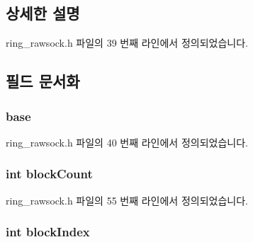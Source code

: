 \subsection{상세한 설명}


ring\+\_\+rawsock.\+h 파일의 39 번째 라인에서 정의되었습니다.



\subsection{필드 문서화}
\subsubsection[{\texorpdfstring{base}{base}}]{ base}\hypertarget{structring__rawsock__t_a1507c5af4508d59cb0a730a852763e94}{}\label{structring__rawsock__t_a1507c5af4508d59cb0a730a852763e94}


ring\+\_\+rawsock.\+h 파일의 40 번째 라인에서 정의되었습니다.

\subsubsection[{\texorpdfstring{block\+Count}{blockCount}}]{\setlength{\rightskip}{0pt plus 5cm}int block\+Count}\hypertarget{structring__rawsock__t_a8425bcfbacc94a75383be43e6114947a}{}\label{structring__rawsock__t_a8425bcfbacc94a75383be43e6114947a}


ring\+\_\+rawsock.\+h 파일의 55 번째 라인에서 정의되었습니다.

\subsubsection[{\texorpdfstring{block\+Index}{blockIndex}}]{\setlength{\rightskip}{0pt plus 5cm}int block\+Index}\hypertarget{structring__rawsock__t_a2a1e28d33a60201939f6745a3b410b57}{}\label{structring__rawsock__t_a2a1e28d33a60201939f6745a3b410b57}


